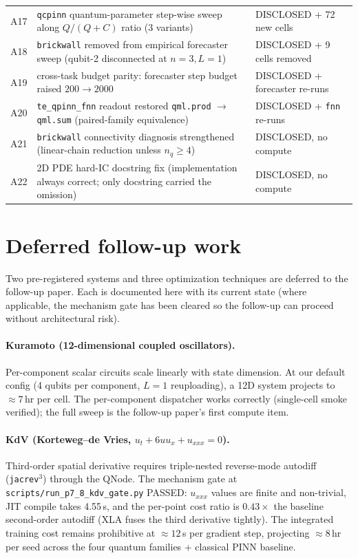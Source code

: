 \documentclass[%
  prx,
  amsmath,
  amssymb,
  aps,
  reprint,
  superscriptaddress,
  floatfix,
]{revtex4-2}
\begin{document}
\begin{table}[t]
\begin{tabular}{lll}
A17 & \texttt{qcpinn} quantum-parameter step-wise sweep along $Q/(Q{+}C)$ ratio (3 variants) & DISCLOSED + 72 new cells \\
A18 & \texttt{brickwall} removed from empirical forecaster sweep (qubit-2 disconnected at $n{=}3,L{=}1$) & DISCLOSED + 9 cells removed \\
A19 & cross-task budget parity: forecaster step budget raised $200 \to 2000$ & DISCLOSED + forecaster re-runs \\
A20 & \texttt{te\_qpinn\_fnn} readout restored \texttt{qml.prod} $\to$ \texttt{qml.sum} (paired-family equivalence) & DISCLOSED + \texttt{fnn} re-runs \\
A21 & \texttt{brickwall} connectivity diagnosis strengthened (linear-chain reduction unless $n_q \geq 4$) & DISCLOSED, no compute \\
A22 & 2D PDE hard-IC docstring fix (implementation always correct; only docstring carried the omission) & DISCLOSED, no compute \\
\bottomrule
\end{tabular}
\end{table}

\section{Deferred follow-up work}
\label{sup:deferred}

Two pre-registered systems and three optimization techniques are
deferred to the follow-up paper. Each is documented here with
its current state (where applicable, the mechanism gate has been
cleared so the follow-up can proceed without architectural risk).

\paragraph{Kuramoto (12-dimensional coupled oscillators).}
Per-component scalar circuits scale linearly with state dimension.
At our default config (4 qubits per component, $L=1$
reuploading), a 12D system projects to $\approx 7$\,hr per cell.
The per-component dispatcher works correctly (single-cell smoke
verified); the full sweep is the follow-up paper's first compute
item.

\paragraph{KdV (Korteweg--de Vries, $u_t + 6 u u_x + u_{xxx} = 0$).}
\label{sup:kdv-gate}
Third-order spatial derivative requires triple-nested
reverse-mode autodiff (\texttt{jacrev}$^3$) through the QNode.
The mechanism gate at \texttt{scripts/run\_p7\_8\_kdv\_gate.py}
PASSED: $u_{xxx}$ values are finite and non-trivial, JIT compile
takes 4.55\,s, and the per-point cost ratio is $0.43\times$ the
baseline second-order autodiff (XLA fuses the third derivative
tightly). The integrated training cost remains prohibitive at
$\approx 12$\,s per gradient step, projecting $\approx 8$\,hr per
seed across the four quantum families + classical PINN baseline.
\end{document}
